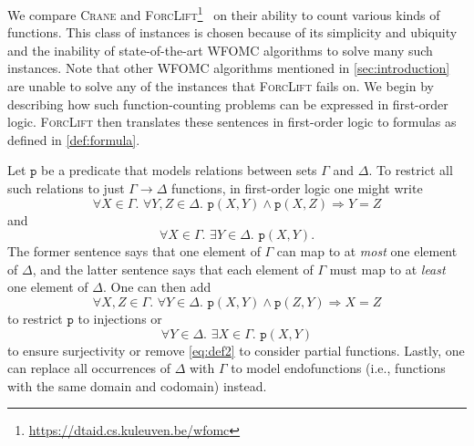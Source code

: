 \documentclass{article}
\theoremstyle{definition}
\theoremstyle{remark}
\begin{document}


We compare \textsc{Crane} and
\textsc{ForcLift}\footnote{\url{https://dtaid.cs.kuleuven.be/wfomc}}~\cite{DBLP:conf/ijcai/BroeckTMDR11}
on their ability to count various kinds of functions. This class of instances is
chosen because of its simplicity and ubiquity and the inability of
state-of-the-art WFOMC algorithms to solve many such instances. Note that other
WFOMC algorithms mentioned in \cref{sec:introduction} are unable to solve any of
the instances that \textsc{ForcLift} fails on. We begin by describing how such
function-counting problems can be expressed in first-order logic.
\textsc{ForcLift} then translates these sentences in first-order logic to
formulas as defined in \cref{def:formula}.

Let $\texttt{p}$ be a predicate that models relations between sets $\Gamma$ and
$\Delta$. To restrict all such relations to just $\Gamma \to \Delta$ functions,
in first-order logic one might write
\[
  \forall X \in \Gamma\text{. }\forall Y,Z \in \Delta\text{. }\texttt{p}(X, Y) \land \texttt{p}(X, Z) \Rightarrow Y = Z
\]
and
\begin{equation}\label{eq:def2}
  \forall X \in \Gamma\text{. }\exists Y \in \Delta\text{. }\texttt{p}(X, Y).
\end{equation}
The former sentence says that one element of $\Gamma$ can map to at \emph{most}
one element of $\Delta$, and the latter sentence says that each element of
$\Gamma$ must map to at \emph{least} one element of $\Delta$. One can then add
\[
  \forall X,Z \in \Gamma\text{. }\forall Y \in \Delta\text{. }\texttt{p}(X, Y) \land \texttt{p}(Z, Y) \Rightarrow X = Z
\]
to restrict $\texttt{p}$ to injections or
\[
  \forall Y \in \Delta\text{. }\exists X \in \Gamma\text{. }\texttt{p}(X, Y)
\]
to ensure surjectivity or remove \cref{eq:def2} to consider partial functions.
Lastly, one can replace all occurrences of $\Delta$ with $\Gamma$ to model
endofunctions (i.e., functions with the same domain and codomain) instead.
\end{document}

